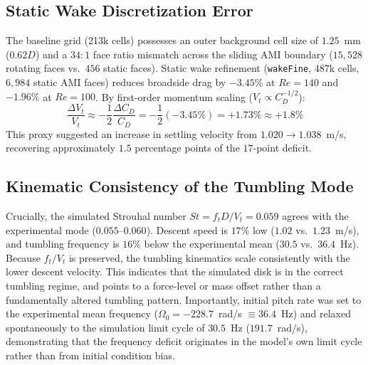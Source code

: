 \documentclass[11pt,a4paper]{article}
\begin{document}
\subsection{Static Wake Discretization Error}
The baseline grid (213k cells) possesses an outer background cell size of $1.25$~mm ($0.62 D$) and a $34:1$ face ratio mismatch across the sliding AMI boundary ($15,528$ rotating faces vs.\ $456$ static faces). Static wake refinement (\texttt{wakeFine}, 487k cells, $6,984$ static AMI faces) reduces broadside drag by $-3.45\%$ at $Re = 140$ and $-1.96\%$ at $Re = 100$. By first-order momentum scaling ($V_t \propto C_D^{-1/2}$):
\begin{equation}
\frac{\Delta V_t}{V_t} \approx -\frac{1}{2} \frac{\Delta C_D}{C_D} = -\frac{1}{2}(-3.45\%) = +1.73\% \approx +1.8\%
\end{equation}
This proxy suggested an increase in settling velocity from $1.020 \to 1.038$~m/s, recovering approximately $1.5$ percentage points of the $17$-point deficit.

\subsection{Kinematic Consistency of the Tumbling Mode}
Crucially, the simulated Strouhal number $St = f_t D / V_t = 0.059$ agrees with the experimental mode ($0.055$--$0.060$). Descent speed is $17\%$ low ($1.02$ vs.\ $1.23$~m/s), and tumbling frequency is $16\%$ below the experimental mean ($30.5$ vs.\ $36.4$~Hz). Because $f_t / V_t$ is preserved, the tumbling kinematics scale consistently with the lower descent velocity. This indicates that the simulated disk is in the correct tumbling regime, and points to a force-level or mass offset rather than a fundamentally altered tumbling pattern. Importantly, initial pitch rate was set to the experimental mean frequency ($\Omega_0 = -228.7$~rad/s $\equiv 36.4$~Hz) and relaxed spontaneously to the simulation limit cycle of $30.5$~Hz ($191.7$~rad/s), demonstrating that the frequency deficit originates in the model's own limit cycle rather than from initial condition bias.
\end{document}
